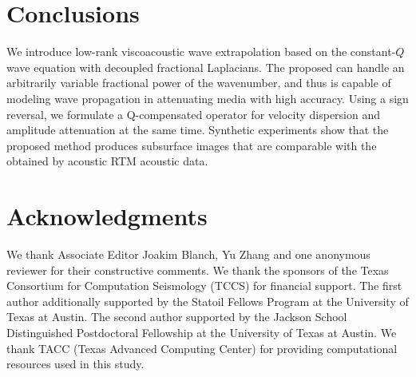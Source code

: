 \section{Conclusions}
We introduce low-rank viscoacoustic wave extrapolation  based on the constant-$Q$ wave equation with decoupled fractional Laplacians. The proposed  can handle an arbitrarily variable fractional power of the wavenumber, and thus is capable of modeling wave propagation in attenuating media with high accuracy. Using a sign reversal, we formulate a Q-compensated operator  for velocity dispersion and amplitude attenuation at the same time.  Synthetic experiments show that the proposed method produces  subsurface images that are comparable with the  obtained by acoustic RTM  acoustic data.


\section{Acknowledgments}
We thank Associate Editor Joakim Blanch, Yu Zhang and one anonymous reviewer for their constructive comments. We thank the sponsors of the Texas Consortium for Computation Seismology (TCCS) for financial support. The first author  additionally supported by the Statoil Fellows Program at the University of Texas at Austin. The second author  supported by the Jackson School Distinguished Postdoctoral Fellowship at the University of Texas at Austin.  We thank TACC (Texas Advanced Computing Center) for providing computational resources used in this study.

\newpage



